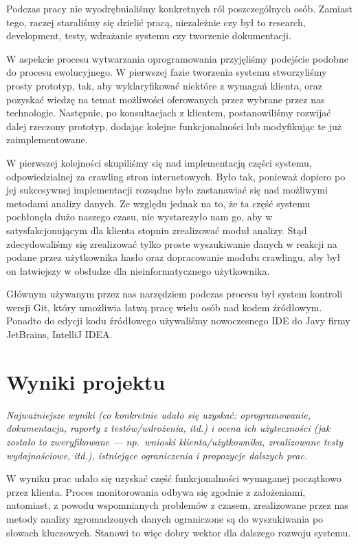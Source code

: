 \documentclass[polish,12pt]{aghthesis}
\begin{document}
Podczas pracy nie wyodrębnialiśmy konkretnych ról poszczególnych osób. Zamiast tego, raczej staraliśmy się dzielić pracą, niezależnie czy
był to
research, development, testy, wdrażanie systemu czy tworzenie dokumentacji.

W aspekcie procesu wytwarzania oprogramowania przyjęliśmy podejście podobne do procesu ewolucyjnego. W pierwszej fazie tworzenia systemu 
stworzyliśmy prosty prototyp, tak, aby wyklaryfikować niektóre z wymagań klienta, oraz pozyskać wiedzę na temat możliwości oferowanych
przez wybrane przez nas technologie. Następnie, po konsultacjach z klientem, postanowiliśmy rozwijać dalej rzeczony prototyp, dodając 
kolejne funkcjonalności lub modyfikując te już zaimplementowane. 

W pierwszej kolejności skupiliśmy się nad implementacją części systemu, odpowiedzialnej za crawling stron internetowych. Było tak, ponieważ
dopiero po jej sukcesywnej implementacji rozsądne było zastanawiać się nad możliwymi metodami analizy danych. Ze względu jednak na to, że 
ta część systemu pochłonęła dużo naszego czasu, nie wystarczyło nam go, aby w satysfakcjonującym dla klienta stopniu zrealizować moduł analizy.
Stąd zdecydowaliśmy się zrealizować tylko proste wyszukiwanie danych w reakcji na podane przez użytkownika hasło oraz dopracowanie modułu crawlingu,
aby był on łatwiejszy w obsłudze dla nieinformatycznego użytkownika. 

Głównym używanym przez nas narzędziem podczas procesu był system kontroli wersji Git, który umożliwia łatwą pracę wielu osób nad kodem źródłowym.
Ponadto do edycji kodu źródłowego używaliśmy nowoczesnego IDE do Javy firmy JetBrains, IntelliJ IDEA.

\section{Wyniki projektu}

\label{sec:wyniki-projektu}

\emph{Najważniejsze wyniki (co konkretnie udało się uzyskać:
  oprogramowanie, dokumentacja, raporty z testów/wdrożenia, itd.)
  i ocena ich użyteczności (jak zostało to zweryfikowane --- np.\ wnioski
  klienta/użytkownika, zrealizowane testy wydajnościowe, itd.),
  istniejące ograniczenia i propozycje dalszych prac.}

W wyniku prac udało się uzyskać część funkcjonalności
wymaganej początkowo przez klienta. Proces monitorowania odbywa się zgodnie z założeniami,
natomiast, z powodu wspomnianych problemów z czasem, zrealizowane przez nas metody analizy
zgromadzonych danych ograniczone są do wyszukiwania po słowach kluczowych. Stanowi
to więc dobry wektor dla dalszego rozwoju systemu.
\end{document}
